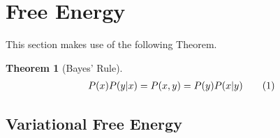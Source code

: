 \documentclass[]{article}
\newcommand\numberthis{\addtocounter{equation}{1}\tag{\theequation}}
\newtheorem{thm}{Theorem}
\begin{document}
\section{Free Energy}
This section makes use of the following Theorem\cite{parr2022Active}.

\begin{thm}[Bayes' Rule]
	\begin{align*}
		 P(x)P(y\vert x) = P(x,y) = P(y)P(x\vert y) \numberthis \label{eq:bayes}
	\end{align*}
\end{thm}

\subsection{Variational Free Energy}
\end{document}
